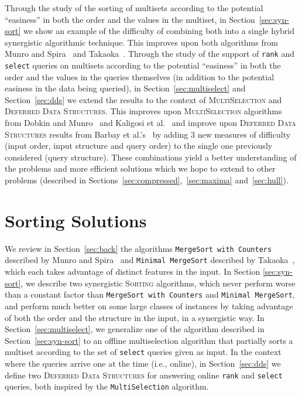 
Through the study of the sorting of multisets according to the
potential ``easiness'' in both the order and the values in the
multiset, in Section~\ref{sec:syn-sort} we show an example of the
difficulty of combining both into a single hybrid synergistic algorithmic
technique. 
This improves upon both algorithms from Munro and
Spira~\cite{1976-JComp-SortingAndSearchingInMultisets-MunroSpira} and
Takaoka~\cite{2009-Chapter-PartialSolutionAndEntropy-Takaoka}.
%
Through the study of the support of \texttt{rank} and \texttt{select}
queries on multisets according to the potential ``easiness'' in both
the order and the values in the queries themselves (in addition to the
potential easiness in the data being queried), in
Section~\ref{sec:multiselect} and Section~\ref{sec:dds} we extend the
results to the context of \textsc{MultiSelection} and \textsc{Deferred
  Data Structures}. This improves upon \textsc{MultiSelection}
algorithms from Dobkin and
Munro~\cite{1981-JACM-OptimalTimeMinimalSpaceSelectionAlgorithms-DobkinMunro}
and Kaligosi et
al.~\cite{2005-ICALP-TowardsOptimalMultopleSelection-KaligosiMehlhornMunroSanders}
and improve upon \textsc{Deferred Data
  Structures} results from Barbay et al.'s~\cite{2016-JDA-NearOptimalOnlineMultiselectionInInternalAndExternalMemory-BarbayGuptaRaoSorenson}
by adding 3 new measures of difficulty (input order, input structure
and query order) to the single one previously considered (query
structure). These combinations yield a better
understanding of the problems and more efficient solutions which we
hope to extend to other problems (described in Sections~\ref{sec:compressed},~\ref{sec:maxima} and~\ref{sec:hull}).

\section{Sorting Solutions}
\label{sec:sort}

We review in Section~\ref{sec:back} the algorithms \texttt{MergeSort
  with Counters} described by Munro and
Spira~\cite{1976-JComp-SortingAndSearchingInMultisets-MunroSpira} and
\texttt{Minimal MergeSort} described by
Takaoka~\cite{2009-Chapter-PartialSolutionAndEntropy-Takaoka}, which each
takes advantage of distinct features in the input. In Section
\ref{sec:syn-sort}, we describe two synergistic \textsc{Sorting}
algorithms, which never perform worse than a constant factor than \texttt{MergeSort with
  Counters} and \texttt{Minimal MergeSort}, and perform much better on
some large classes of instances by taking advantage of both the order
and the structure in the input, in a synergistic way. In
Section~\ref{sec:multiselect}, we generalize one of the algorithm
described in Section~\ref{sec:syn-sort} to an offline multiselection
algorithm that partially sorts a multiset according to the set of
\texttt{select} queries given as input. In the context where the
queries arrive one at the time (i.e., online), in
Section~\ref{sec:dds} we define two \textsc{Deferred Data Structures}
for answering online \texttt{rank} and \texttt{select} queries, both
inspired by the \texttt{MultiSelection} algorithm.

